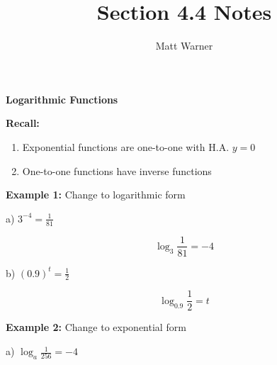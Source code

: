 \documentclass{report}
\title{\Huge{Section 4.4 Notes}}
\author{\huge{Matt Warner}}
\date{\huge{}}
\begin{document}
	\maketitle	


\begin{huge}
 \begin{center}
	 \textbf{Logarithmic Functions}
 \end{center} 
\end{huge}
\bigbreak \noindent \bigbreak \noindent
\begin{LARGE}
	\textbf{Recall:}
\end{LARGE}
\begin{large}
 \begin{enumerate}
	 \item Exponential functions are one-to-one with H.A. $y=0$ 
	 \item One-to-one functions have inverse functions
 \end{enumerate} 

\end{large}
\bigbreak \noindent \bigbreak \noindent
{}
\bigbreak \noindent \bigbreak \noindent
\begin{large}
	\textbf{Example 1:}
	Change to logarithmic form
\end{large}

\bigbreak \noindent 
\begin{large}
a) $3^{-4}=\frac{1}{81}$
\end{large}

$$
\log _3 \frac{1}{81}=-4
$$

\bigbreak \noindent \bigbreak \noindent
\begin{large}
b) $(0.9)^t=\frac{1}{2}$
\end{large}


$$
\log _{0.9} \frac{1}{2}=t
$$
\bigbreak \noindent \bigbreak \noindent

\begin{large}
	\noindent \textbf{Example 2:} 
	Change to exponential form
\end{large}
\bigbreak \noindent 
\begin{large}
a) $\log _a \frac{1}{256}=-4$
\end{large}
\end{document}
